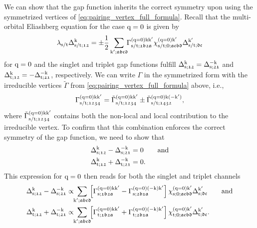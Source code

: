 \documentclass[../../main.tex]{subfiles}
\begin{document}
We can show that the gap function inherits the correct symmetry upon using the symmetrized vertices of \eqref{eq:pairing_vertex_full_formula}. Recall that the multi-orbital Eliashberg equation for the case $\text{q}=0$ is given by 
\begin{align}
	\lambda_{\text{s}/\text{t}}\Delta_{\text{s}/\text{t};\mathfrak{12}}^{\text{k}}=\pm\frac{1}{2}\sum_{\text{k}';\mathfrak{abcd}}\!\!\Gamma^{(\text{q}=0)\text{k}\text{k}'}_{\text{s}/\text{t};\mathfrak{1b2a}}\chi^{(\text{q}=0)\text{k}'}_{\text{s}/\text{t};0;\mathfrak{acbd}}\Delta_{\text{s}/\text{t};\mathfrak{dc}}^{\text{k}'}
\end{align}
for $\text{q}=0$ and the singlet and triplet gap functions fulfill $\Delta_{\text{s};\mathfrak{12}}^{\text{k}}=\Delta_{\text{s};\mathfrak{21}}^{-\text{k}}$ and $\Delta_{\text{t};\mathfrak{12}}^{\text{k}}=-\Delta_{\text{t};\mathfrak{21}}^{-\text{k}}$, respectively. We can write $\Gamma$ in the symmetrized form with the irreducible vertices $\tilde{\Gamma}$ from \eqref{eq:pairing_vertex_full_formula} above, i.e.,
\begin{align}\label{eq:symmetrization_pairing_vertex}
	\Gamma^{(\text{q}=0)\text{k}\text{k}'}_{\text{s}/\text{t};\mathfrak{1234}} = \tilde{\Gamma}^{(\text{q}=0)\text{k}\text{k}'}_{\text{s}/\text{t};\mathfrak{1234}}\pm \tilde{\Gamma}^{(\text{q}=0)\text{k}(-\text{k}')}_{\text{s}/\text{t};\mathfrak{1432}},
\end{align}
where $\tilde{\Gamma}^{(\text{q}=0)\text{k}\text{k}'}_{\text{s}/\text{t};\mathfrak{1234}}$ contains both the non-local and local contribution to the irreducible vertex. To confirm that this combination enforces the correct symmetry of the gap function, we need to show that
\begin{subequations}
\begin{align}
	\Delta_{\text{s};\mathfrak{12}}^{\text{k}}-\Delta_{\text{s};\mathfrak{21}}^{-\text{k}}&=0\qquad\text{and}\\
	\Delta_{\text{t};\mathfrak{12}}^{\text{k}}+\Delta_{\text{t};\mathfrak{21}}^{-\text{k}}&=0.
\end{align}
\end{subequations}
This expression for $\text{q}=0$ then reads for both the singlet and triplet channels
\begin{subequations}
\begin{align}
	\Delta_{\sing;\mathfrak{12}}^{\k}-\Delta_{\sing;\mathfrak{21}}^{-\k}&\propto\!\!\sum_{\kp;\mathfrak{abcd}}\!\! \left [\Gamma^{(\q=0)\k\kp}_{\sing;\mathfrak{1b2a}}-\Gamma^{(\q=0)(-\k)\kp}_{\sing;\mathfrak{2b1a}}\right ]\chi^{(\q=0)\kp}_{\sing;0;\mathfrak{acbd}}\Delta_{\sing;\mathfrak{dc}}^{\kp}\label{eq:symmetrization_delta_first_formula_singlet}\qqand\\
	\Delta_{\trip;\mathfrak{12}}^{\k}+\Delta_{\trip;\mathfrak{21}}^{-\k}&\propto\!\!\sum_{\kp;\mathfrak{abcd}}\!\! \left [\Gamma^{(\q=0)\k\kp}_{\trip;\mathfrak{1b2a}}+\Gamma^{(\q=0)(-\k)\kp}_{\trip;\mathfrak{2b1a}}\right ]\chi^{(\q=0)\kp}_{\trip;0;\mathfrak{acbd}}\Delta_{\trip;\mathfrak{dc}}^{\kp}\label{eq:symmetrization_delta_first_formula_triplet}.
\end{align}
\end{subequations}
\end{document}
